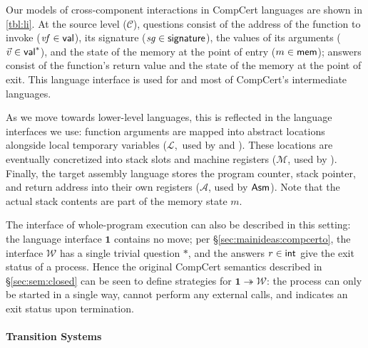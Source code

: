 \documentclass[sigplan,screen]{acmart}
\begin{document}
Our models of cross-component interactions in CompCert languages
are shown in \autoref{tbl:li}.
At the source level ($\mathcal{C}$),
questions consist of
the address of the function to invoke
($\mathit{vf} \in  \mathsf{val} $),
its signature
($\mathit{sg} \in  \mathsf{signature} $),
the values of its arguments
($\vec{v} \in  \mathsf{val} ^*$),
and the state of the memory at the point of entry
($m \in  \mathsf{mem} $);
answers
consist of the function's return value
and the state of the memory at the point of exit.
This language interface is used for  and
most of CompCert's intermediate languages.

As we move towards lower-level languages,
this is reflected in the language interfaces we use:
function arguments are mapped into
abstract locations alongside local temporary variables
($\mathcal{L}$,~used by  and ).
These locations are eventually concretized into
stack slots and machine registers
($\mathcal{M}$, used by ).
Finally, the target assembly language
stores the program counter, stack pointer,
and return address into their own registers
($\mathcal{A}$, used by $ \mathsf{Asm} $).
Note that the actual stack contents
are part of the memory state $m$.

The interface of whole-program execution
can also be described in this setting:
the language interface $\mathbf{1}$ contains no move;
per \S\ref{sec:mainideas:compcerto},
the interface $\mathcal{W}$ has a single trivial question $*$,
and the answers $r \in  \mathsf{int} $
give the exit status of a process.
Hence the original CompCert semantics described in
\S\ref{sec:sem:closed}
can be seen to define strategies for
$\mathbf{1} \twoheadrightarrow \mathcal{W}$:
the process can only be started in a single way,
cannot perform any external calls,
and indicates an exit status upon termination.


\paragraph{Transition Systems} %
\end{document}
